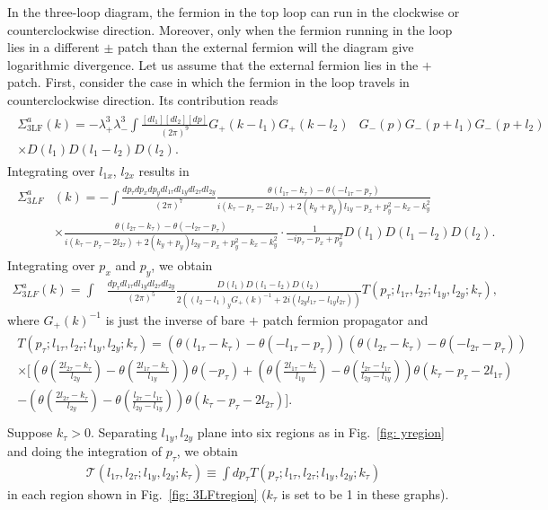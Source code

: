 \documentclass[prx,amsmath,amssymb, notitlepage, onecolumn,
nofootinbib,
superscriptaddress,
longbibliography
]{revtex4-1}
\newcommand{\beq}{\begin{eqnarray}}
\newcommand{\eeq}{\end{eqnarray}}
\begin{document}
In the three-loop diagram, the fermion in the top loop can run in the clockwise or counterclockwise direction. 
Moreover, only when the fermion running in the loop lies in a different $\pm$ patch than the external fermion \cite{Metlitski2010,Sur2014} will the diagram give logarithmic divergence. 
Let us assume that the external fermion lies in the $+$ patch. 
First, consider the case in which the fermion in the loop travels in counterclockwise direction. 
Its contribution reads
\beq
\begin{split}
\Sigma_{\text{3LF}}^a(k) = -\lambda_+^3 \lambda_-^3 \int\frac{[dl_1][dl_2][dp]}{(2\pi)^9}G_+(k-l_1) G_+(k-l_2)&G_-(p)G_-(p+l_1) G_-(p+l_2)\\
\times D(l_1) D(l_1-l_2) D(l_2).
\end{split}
\eeq
Integrating over $l_{1x}$, $l_{2x}$ 
results in
\beq
\begin{split}
\Sigma_{3LF}^a&(k) = -\int\frac{dp_\tau dp_x dp_y dl_{1\tau} dl_{1y} dl_{2\tau} dl_{2y}}{(2\pi)^7}\frac{\theta( l_{1\tau}-k_\tau)-\theta(- l_{1\tau}-p_\tau)}{i(k_\tau-p_\tau-2l_{1\tau})+2(k_y+p_y) l_{1y}-p_x+p_y^2-k_x-k_y^2}\\
&\times\frac{\theta(l_{2\tau}-k_\tau)-\theta(-l_{2\tau}-p_\tau)}{i(k_\tau-p_\tau-2l_{2\tau})+2(k_y+p_y) l_{2y}-p_x+p_y^2-k_x-k_y^2}\cdot\frac{1}{-ip_\tau - p_x +p_y^2}D(l_1) D(l_1-l_2) D(l_2).
\end{split}
\eeq
Integrating over $p_x$  and $p_y$, we obtain
\beq\label{eq: main form of 3LF}
\Sigma_{3LF}^a(k) = \int&\frac{dp_\tau  dl_{1\tau} dl_{1y} dl_{2\tau} dl_{2y}}{(2\pi)^5}\frac{D(l_1) D(l_1-l_2) D(l_2)}{2\left((l_2-l_1)_y G_+(k)^{-1} + 2i(l_{2y} l_{1\tau}-l_{1y} l_{2\tau})\right)}T(p_\tau; l_{1\tau}, l_{2\tau}; l_{1y}, l_{2y}; k_\tau),
\eeq
where $G_+(k)^{-1}$ is just the inverse of bare $+$ patch fermion propagator and 
\beq\label{eq: def of mathsfLF}
\begin{split}
T(p_\tau; l_{1\tau}, l_{2\tau}; l_{1y}, l_{2y}; k_\tau) =\left(\theta( l_{1\tau}-k_\tau)-\theta(- l_{1\tau}-p_\tau)\right)\left(\theta( l_{2\tau}-k_\tau)-\theta(- l_{2\tau}-p_\tau)\right) \\
\times\Bigg[\left(\theta\left(\frac{2l_{2\tau}-k_\tau}{l_{2y}}\right)-\theta\left(\frac{2l_{1\tau}-k_\tau}{l_{1y}}\right)\right)\theta(-p_\tau) + \left(\theta\left(\frac{2l_{1\tau}-k_\tau}{l_{1y}}\right)-\theta\left(\frac{l_{2\tau}-l_{1\tau}}{l_{2y} - l_{1y}}\right)\right)\theta\left(k_\tau-p_\tau-2l_{1\tau}\right)\\ 
-\left(\theta\left(\frac{2l_{2\tau}-k_\tau}{l_{2y}}\right)-\theta\left(\frac{l_{2\tau}-l_{1\tau}}{l_{2y} - l_{1y}}\right)\right)\theta\left(k_\tau-p_\tau-2l_{2\tau}\right)\Bigg].\\
\end{split}
\eeq
Suppose $k_\tau>0$. Separating $l_{1y}, l_{2y}$ plane into six regions as in Fig.~\ref{fig: yregion} and doing the integration of $p_\tau$, we obtain
\beq
\mathcal{T}(l_{1\tau}, l_{2\tau}; l_{1y}, l_{2y}; k_\tau) \equiv \int d p_\tau T(p_\tau; l_{1\tau}, l_{2\tau}; l_{1y}, l_{2y}; k_\tau) 
\eeq
in each region shown in Fig.~\ref{fig: 3LFtregion} ($k_\tau$ is set to be 1 in these graphs).
\end{document}
